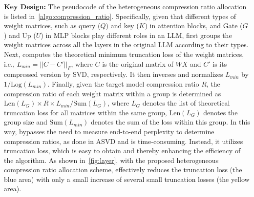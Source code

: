\noindent \textbf{Key Design:} 
%
The pseudocode of the heterogeneous compression ratio allocation is listed in~\cref{algo:compression_ratio}. 
%
Specifically, 
%
given that different types of weight matrices, such as query ($Q$) and key ($K$) in attention blocks, and Gate ($G$) and Up ($U$) in MLP blocks play different roles in an LLM, 
\sysname first groups the weight matrices across all the layers in the original LLM according to their types. 
%
Next, \sysname computes the theoretical minimum truncation loss of the weight matrices, i.e., $L_{min} = ||C-C'||_F$, where $C$ is the original matrix of $WX$ and $C'$  is its compressed version by SVD, respectively. It then inverses and normalizes $L_{min}$ by $1/\text{Log}(L_{min})$.
%
Finally, given the target model compression ratio $R$, the compression ratio of each weight matrix within a group is determined as $ \text{Len}(L_{G}) \times R \times L_{min} / \text{Sum}(L_{G})$, where $L_{G}$ denotes the list of theoretical truncation loss for all matrices within the same group, $\text{Len}(L_{G})$ denotes the group size and $\text{Sum}(L_{min})$ denotes the sum of the loss within this group. 
%
In this way, \sysname bypasses the need to measure end-to-end perplexity to determine compression ratios, as done in ASVD and is time-consuming. Instead, it utilizes truncation loss, which is easy to obtain and thereby enhancing the efficiency of the algorithm.
%
As shown in~\cref{fig:layer}, with the proposed heterogeneous compression ratio allocation scheme, \sysname effectively reduces the truncation loss (the blue area) with only a small increase of several small truncation losses (the yellow area).

